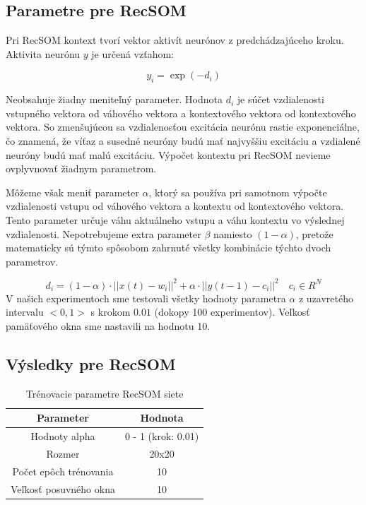\subsection{Parametre pre RecSOM}
Pri RecSOM kontext tvorí vektor aktivít neurónov z predchádzajúceho kroku.
Aktivita neurónu $y$ je určená vzťahom:

\begin{equation}
    y_{i} = \exp{(-d_{i})}
\end{equation}

Neobsahuje žiadny meniteľný parameter. Hodnota $d_{i}$ je súčet vzdialenosti vstupného vektora od váhového vektora a kontextového vektora od 
kontextového vektora. So zmenšujúcou sa vzdialenosťou excitácia neurónu rastie exponenciálne, čo 
znamená, že víťaz a susedné neuróny budú mať najvyššiu excitáciu a vzdialené neuróny budú mať malú excitáciu.
Výpočet kontextu pri RecSOM nevieme ovplyvnovať žiadnym parametrom.

Môžeme však meniť parameter $\alpha$, ktorý sa používa pri samotnom výpočte vzdialenosti
vstupu od váhového vektora a kontextu od kontextového vektora. Tento parameter určuje váhu aktuálneho vstupu a váhu kontextu
vo výslednej vzdialenosti.
Nepotrebujeme extra parameter $\beta$ namiesto $(1 - \alpha)$, pretože matematicky sú týmto spôsobom zahrnuté všetky kombinácie
týchto dvoch parametrov.

\begin{equation}
	d_i = (1 - \alpha) \cdot ||x(t) - w_i||^{2} + \alpha \cdot ||y(t-1) - c_i||^{2} \quad c_{i} \in R^{N}
\end{equation}
V našich experimentoch sme testovali všetky hodnoty parametra $\alpha$ z uzavretého intervalu
$<0, 1>$ s krokom $0.01$ (dokopy 100 experimentov).
Veľkosť pamäťového okna sme nastavili na hodnotu 10.

\subsection{Výsledky pre RecSOM}

\begin{table}[h!]
    \centering
    \begin{tabular}{|c|c|} 
     \hline
     Parameter & Hodnota \\ 
     \hline\hline
     Hodnoty alpha & 0 - 1  (krok: 0.01) \\ 
     \hline
     Rozmer  & 20x20  \\
     \hline
     Počet epôch trénovania & 10 \\
     \hline
     Veľkosť posuvného okna & 10  \\
     \hline
    \end{tabular}
    \caption{Trénovacie parametre RecSOM siete}
    \label{table:1}
    \end{table}


